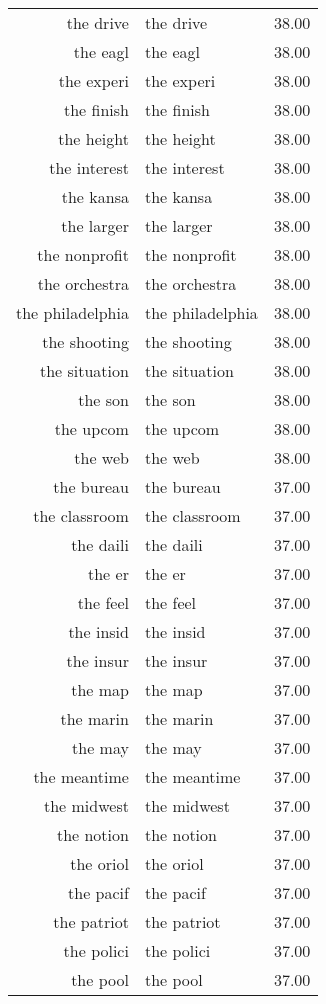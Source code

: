 \begin{table}[ht]
\begin{tabular}{rlr}
  the drive & the drive & 38.00 \\ 
  the eagl & the eagl & 38.00 \\ 
  the experi & the experi & 38.00 \\ 
  the finish & the finish & 38.00 \\ 
  the height & the height & 38.00 \\ 
  the interest & the interest & 38.00 \\ 
  the kansa & the kansa & 38.00 \\ 
  the larger & the larger & 38.00 \\ 
  the nonprofit & the nonprofit & 38.00 \\ 
  the orchestra & the orchestra & 38.00 \\ 
  the philadelphia & the philadelphia & 38.00 \\ 
  the shooting & the shooting & 38.00 \\ 
  the situation & the situation & 38.00 \\ 
  the son & the son & 38.00 \\ 
  the upcom & the upcom & 38.00 \\ 
  the web & the web & 38.00 \\ 
  the bureau & the bureau & 37.00 \\ 
  the classroom & the classroom & 37.00 \\ 
  the daili & the daili & 37.00 \\ 
  the er & the er & 37.00 \\ 
  the feel & the feel & 37.00 \\ 
  the insid & the insid & 37.00 \\ 
  the insur & the insur & 37.00 \\ 
  the map & the map & 37.00 \\ 
  the marin & the marin & 37.00 \\ 
  the may & the may & 37.00 \\ 
  the meantime & the meantime & 37.00 \\ 
  the midwest & the midwest & 37.00 \\ 
  the notion & the notion & 37.00 \\ 
  the oriol & the oriol & 37.00 \\ 
  the pacif & the pacif & 37.00 \\ 
  the patriot & the patriot & 37.00 \\ 
  the polici & the polici & 37.00 \\ 
  the pool & the pool & 37.00 \\ 

\end{tabular}
\end{table}
